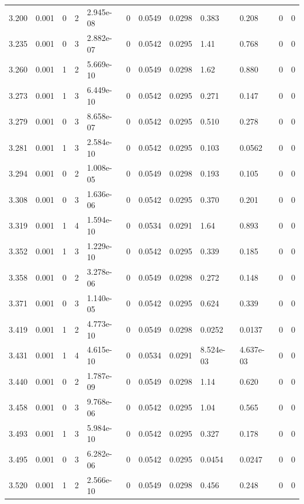 \documentclass[preview]{standalone}
\begin{document}
{{{{{{\begin{tabular}{L{1.2cm}C{1.2cm} C{0.3cm}C{0.5cm} C{1.4cm}C{1.4cm} C{1.4cm}C{1.4cm} C{1.6cm}C{1.6cm} C{1.6cm}C{1.6cm}}
  3.200  &  0.001  & 0     &  2 &  2.945e-08  & 0  &  0.0549&   0.0298& 0.383 & 0.208   &  0 & 0  \\ 
  3.235  &  0.001  & 0     &  3 &  2.882e-07  & 0  &  0.0542&   0.0295& 1.41 & 0.768   &  0 & 0  \\ 
  3.260  &  0.001  & 1     &  2 &  5.669e-10  & 0  &  0.0549&   0.0298& 1.62 & 0.880   &  0 & 0  \\ 
  3.273  &  0.001  & 1     &  3 &  6.449e-10  & 0  &  0.0542&   0.0295& 0.271 & 0.147   &  0 & 0  \\ 
  3.279  &  0.001  & 0     &  3 &  8.658e-07  & 0  &  0.0542&   0.0295& 0.510 & 0.278   &  0 & 0  \\ 
  3.281  &  0.001  & 1     &  3 &  2.584e-10  & 0  &  0.0542&   0.0295& 0.103 & 0.0562   &  0 & 0  \\ 
  3.294  &  0.001  & 0     &  2 &  1.008e-05  & 0  &  0.0549&   0.0298& 0.193 & 0.105   &  0 & 0  \\ 
  3.308  &  0.001  & 0     &  3 &  1.636e-06  & 0  &  0.0542&   0.0295& 0.370 & 0.201   &  0 & 0  \\ 
  3.319  &  0.001  & 1     &  4 &  1.594e-10  & 0  &  0.0534&   0.0291& 1.64 & 0.893   &  0 & 0  \\ 
  3.352  &  0.001  & 1     &  3 &  1.229e-10  & 0  &  0.0542&   0.0295& 0.339 & 0.185   &  0 & 0  \\ 
  3.358  &  0.001  & 0     &  2 &  3.278e-06  & 0  &  0.0549&   0.0298& 0.272 & 0.148   &  0 & 0  \\ 
  3.371  &  0.001  & 0     &  3 &  1.140e-05  & 0  &  0.0542&   0.0295& 0.624 & 0.339   &  0 & 0  \\ 
  3.419  &  0.001  & 1     &  2 &  4.773e-10  & 0  &  0.0549&   0.0298& 0.0252 & 0.0137   &  0 & 0  \\ 
  3.431  &  0.001  & 1     &  4 &  4.615e-10  & 0  &  0.0534&   0.0291& 8.524e-03 & 4.637e-03   &  0 & 0  \\ 
  3.440  &  0.001  & 0     &  2 &  1.787e-09  & 0  &  0.0549&   0.0298& 1.14 & 0.620   &  0 & 0  \\ 
  3.458  &  0.001  & 0     &  3 &  9.768e-06  & 0  &  0.0542&   0.0295& 1.04 & 0.565   &  0 & 0  \\ 
  3.493  &  0.001  & 1     &  3 &  5.984e-10  & 0  &  0.0542&   0.0295& 0.327 & 0.178   &  0 & 0  \\ 
  3.495  &  0.001  & 0     &  3 &  6.282e-06  & 0  &  0.0542&   0.0295& 0.0454 & 0.0247   &  0 & 0  \\ 
  3.520  &  0.001  & 1     &  2 &  2.566e-10  & 0  &  0.0549&   0.0298& 0.456 & 0.248   &  0 & 0  \\ 

\end{tabular}}}}}}}
\end{document}
